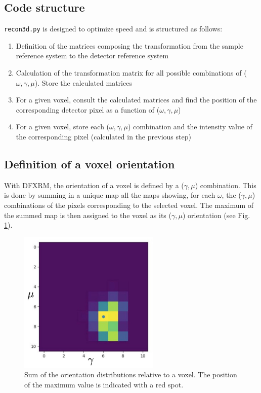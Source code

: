 \documentclass[11pt]{scrartcl}
\begin{document}
\subsection{Code structure}

{\texttt{recon3d.py}} is designed to optimize speed and is structured as follows: 
\begin{enumerate}
    \item Definition of the matrices composing the transformation from the sample reference system to the detector reference system
    \item Calculation of the transformation matrix for all possible combinations of ($\omega, \gamma, \mu$). Store the calculated matrices
    \item For a given voxel, consult the calculated matrices and find the position of the corresponding detector pixel as a function of ($\omega, \gamma, \mu$)
    \item For a given voxel, store each ($\omega, \gamma, \mu$) combination and the intensity value of the corresponding pixel (calculated in the previous step)
\end{enumerate}

\subsection{Definition of a voxel orientation}

With {\footnotesize{DFXRM}}, the orientation of a voxel is defined by a ($\gamma, \mu$) combination. This is done by summing in a unique map all the maps showing, for each $\omega$, the ($\gamma, \mu$) combinations of the pixels corresponding to the selected voxel. The maximum of the summed map is then assigned to the voxel as its ($\gamma, \mu$) orientation (see Fig. \ref{fig:mosaicity_map}).

\begin{figure}[h]
    \centering
    \includegraphics[width=0.6\textwidth]{Mosaicity_map.png}
    \caption{Sum of the orientation distributions relative to a voxel. The position of the maximum value is indicated with a red spot.}
    \label{fig:mosaicity_map}
\end{figure}
\end{document}
